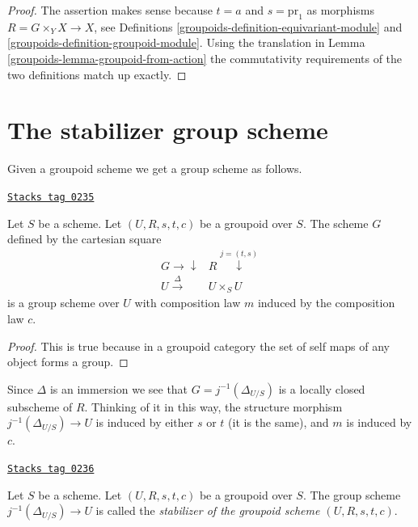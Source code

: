 \begin{proof}

The assertion makes sense because $t = a$ and $s = \text{pr}_1$
as morphisms $R = G \times_Y X \to X$, see
Definitions \ref{groupoids-definition-equivariant-module} and
\ref{groupoids-definition-groupoid-module}.
Using the translation in Lemma \ref{groupoids-lemma-groupoid-from-action}
the commutativity requirements
of the two definitions match up exactly.
\end{proof}

\section{The stabilizer group scheme}
\label{groupoids-section-stabilizer}
Given a groupoid scheme we get a group scheme as follows.

\begin{lemma}
\label{groupoids-lemma-groupoid-stabilizer}
\href{https://stacks.math.columbia.edu/tag/0235}{\texttt{Stacks tag 0235}}

Let $S$ be a scheme.
Let $(U, R, s, t, c)$ be a groupoid over $S$.
The scheme $G$ defined by the cartesian square
$$
\begin{array}{cc}G \longrightarrow\downarrow & R \overset{j = (t, s)}{\downarrow} \\ U \overset{\Delta}{\longrightarrow} & U \times_S U\end{array}
$$
is a group scheme over $U$ with composition law
$m$ induced by the composition law $c$.
\end{lemma}

\begin{proof}
This is true because in a groupoid category the
set of self maps of any object forms a group.
\end{proof}

Since $\Delta$ is an immersion we see that $G = j^{-1}(\Delta_{U/S})$
is a locally closed subscheme of $R$. Thinking of it in this way,
the structure morphism $j^{-1}(\Delta_{U/S}) \to U$ is induced by
either $s$ or $t$ (it is the same), and $m$ is induced by $c$.

\begin{definition}
\label{groupoids-definition-stabilizer-groupoid}
\href{https://stacks.math.columbia.edu/tag/0236}{\texttt{Stacks tag 0236}}

Let $S$ be a scheme.
Let $(U, R, s, t, c)$ be a groupoid over $S$.
The group scheme $j^{-1}(\Delta_{U/S})\to U$
is called the {\it stabilizer of the groupoid scheme
$(U, R, s, t, c)$}.
\end{definition}

